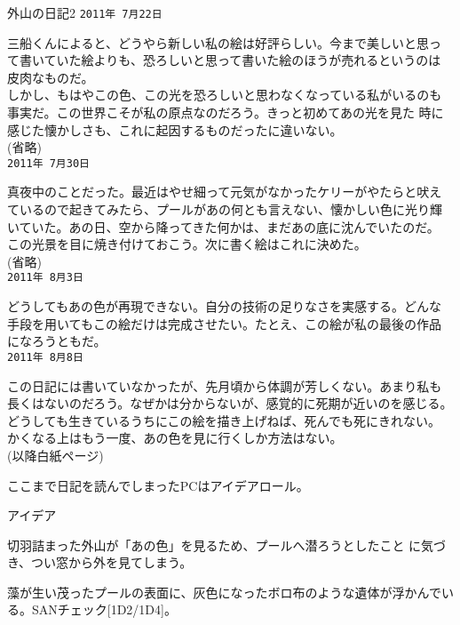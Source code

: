 \documentclass[a4paper,8pt,min]{jsarticle}
\begin{document}
\begin{itembox}{外山の日記2}
 \tt{2011年 7月22日}

 三船くんによると、どうやら新しい私の絵は好評らしい。今まで美しいと思っ
 て書いていた絵よりも、恐ろしいと思って書いた絵のほうが売れるというのは
 皮肉なものだ。\\
 しかし、もはやこの色、この光を恐ろしいと思わなくなっている私がいるのも
 事実だ。この世界こそが私の原点なのだろう。きっと初めてあの光を見た
 時に感じた懐かしさも、これに起因するものだったに違いない。\\

 (省略)\\

 \tt{2011年 7月30日}

 真夜中のことだった。最近はやせ細って元気がなかったケリーがやたらと吠え
 ているので起きてみたら、プールがあの何とも言えない、懐かしい色に光り輝
 いていた。あの日、空から降ってきた何かは、まだあの底に沈んでいたのだ。\\
 この光景を目に焼き付けておこう。次に書く絵はこれに決めた。\\

 (省略)\\

 \tt{2011年 8月3日}

 どうしてもあの色が再現できない。自分の技術の足りなさを実感する。どんな
 手段を用いてもこの絵だけは完成させたい。たとえ、この絵が私の最後の作品
 になろうともだ。\\

 \tt{2011年 8月8日}

 この日記には書いていなかったが、先月頃から体調が芳しくない。あまり私も
 長くはないのだろう。なぜかは分からないが、感覚的に死期が近いのを感じる。
 \\
 どうしても生きているうちにこの絵を描き上げねば、死んでも死にきれない。
 かくなる上はもう一度、あの色を見に行くしか方法はない。\\

 (以降白紙ページ)

\end{itembox}

ここまで日記を読んでしまったPCはアイデアロール。

\begin{judge}{アイデア}
 \item 切羽詰まった外山が「あの色」を見るため、プールへ潜ろうとしたこと
 に気づき、つい窓から外を見てしまう。
\end{judge}

藻が生い茂ったプールの表面に、灰色になったボロ布のような遺体が浮かんでい
る。SANチェック[1D2/1D4]。
\end{document}
